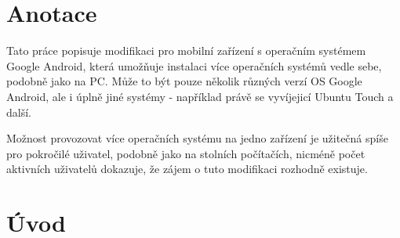 \documentclass[12pt, a4paper, oneside]{article}
\begin{document}
\section*{Anotace}


Tato práce popisuje modifikaci pro mobilní zařízení s operačním systémem Google Android, která umožňuje instalaci více operačních systémů vedle sebe, podobně jako na PC. Může to být pouze několik různých verzí OS Google Android, ale i úplně jiné systémy - například právě se vyvíjejicí Ubuntu Touch a další.

Možnost provozovat více operačních systému na jedno zařízení je užitečná spíše pro pokročilé uživatel, podobně jako na stolních počítačích, nicméně počet aktivních uživatelů dokazuje, že zájem o tuto modifikaci rozhodně existuje.

\addtolength{\textheight}{30mm} %

\newpage
\pagestyle{plain}

\setlength{\voffset}{-20mm} %
\setcounter{page}{1}  %

\tableofcontents  %

\addtolength{\textheight}{-30mm} %
\newpage
\setlength{\voffset}{0mm} %
\pagestyle{plain}

%
\section*{Úvod}
\label{uvod}
\end{document}
